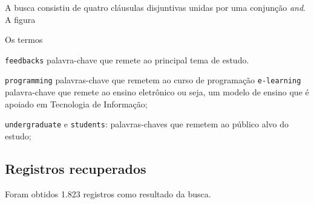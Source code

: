 A busca consistiu de quatro cláusulas disjuntivas unidas por uma conjunção \textit{and}. A figura

Os termos

 \texttt{feedbacks} palavra-chave que remete ao principal tema de estudo.
 
 \texttt{programming} palavras-chave que remetem ao curso de programação 
 \texttt{e-learning} palavra-chave  que remete ao ensino eletrônico ou seja, um modelo de ensino que é apoiado em Tecnologia de Informação;

\texttt{undergraduate} e \texttt{students}: palavras-chaves que remetem ao público alvo do estudo; 

\subsection{Registros recuperados}

Foram obtidos 1.823 registros como resultado da busca. 





